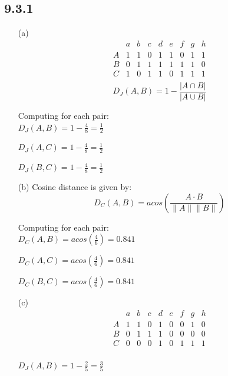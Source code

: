 \documentclass{article}
\begin{document}
\subsection*{9.3.1}
\begin{enumerate}
    \item[(a)]
            \[
            \begin{array}{c|cccccccc}
            & a & b & c & d & e & f & g & h \\
            \hline
            A & 1 & 1 & 0 & 1 & 1 & 0 & 1 & 1 \\
            B & 0 & 1 & 1 & 1 & 1 & 1 & 1 & 0 \\
            C & 1 & 0 & 1 & 1 & 0 & 1 & 1 & 1 \\
            \end{array}
            \]
            \[
        D_J(A,B) = 1 - \frac{|A \cap B|}{|A \cup B|}
        \]

        Computing for each pair:\\

        \(D_J(A,B) = 1 - \frac{4}{8} = \frac{1}{2}\)

        \(D_J(A,C) = 1 - \frac{4}{8} = \frac{1}{2}\)

        \(D_J(B,C) = 1 - \frac{4}{8} = \frac{1}{2}\)
    \item[(b)]
        Cosine distance is given by:\\

        \[
        D_C(A,B) = acos(\frac{A \cdot B}{\|A\| \|B\|})
        \]

        Computing for each pair:\\

        \(D_C(A,B) = acos(\frac{4}{6}) = 0.841\)

        \(D_C(A,C) = acos(\frac{4}{6}) = 0.841\)

        \(D_C(B,C) = acos(\frac{4}{6}) = 0.841\)
    \item[(c)]
        \[
        \begin{array}{c|cccccccc}
        & a & b & c & d & e & f & g & h \\
        \hline
        A & 1 & 1 & 0 & 1 & 0 & 0 & 1 & 0 \\
        B & 0 & 1 & 1 & 1 & 0 & 0 & 0 & 0 \\
        C & 0 & 0 & 0 & 1 & 0 & 1 & 1 & 1 \\
        \end{array}
        \]
    
        \(D_J(A,B) = 1 - \frac{2}{5} = \frac{3}{5}\)


\end{enumerate}
\end{document}
